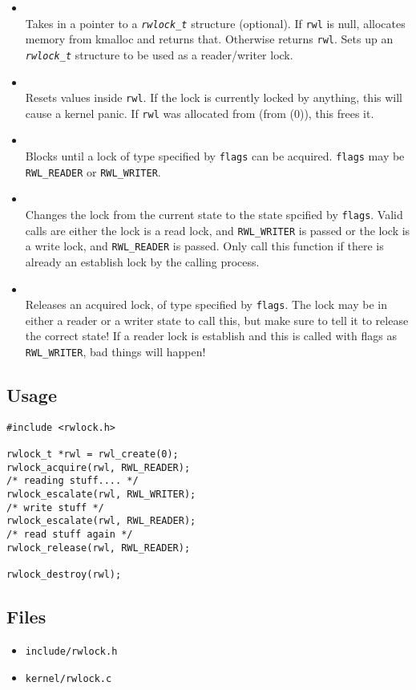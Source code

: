 \documentclass[a4paper]{article}
\begin{document}
\begin{itemize}
\item {} \\
Takes in a pointer to a \texttt{\textit{rwlock\_t}} structure (optional). If \texttt{rwl} is null, allocates
memory from kmalloc and returns that. Otherwise returns \texttt{rwl}. Sets up an \texttt{\textit{rwlock\_t}}
structure to be used as a reader/writer lock.

\item {} \\
Resets values inside \texttt{rwl}. If the lock is currently locked by anything,
this will cause a kernel panic. If \texttt{rwl} was allocated from  (from (0)), this frees it.

\item {} \\
Blocks until a lock of type specified by \texttt{flags} can be acquired. \texttt{flags} may
be \texttt{RWL\_READER} or \texttt{RWL\_WRITER}. 
\item {} \\
Changes the lock from the current state to the state spcified by \texttt{flags}. Valid calls are either
the lock is a read lock, and \texttt{RWL\_WRITER} is passed or the lock is a write lock, and \texttt{RWL\_READER}
is passed. Only call this function if there is already an establish lock by the calling process.
\item {} \\
Releases an acquired lock, of type specified by \texttt{flags}. The lock may be in either a reader or a writer state to call this, but
make sure to tell it to release the correct state! If a reader lock is establish and this is called
with flags as \texttt{RWL\_WRITER}, bad things will happen!
\end{itemize}

\subsection{Usage}
\begin{lstlisting}
#include <rwlock.h>

rwlock_t *rwl = rwl_create(0);
rwlock_acquire(rwl, RWL_READER);
/* reading stuff.... */
rwlock_escalate(rwl, RWL_WRITER);
/* write stuff */
rwlock_escalate(rwl, RWL_READER);
/* read stuff again */
rwlock_release(rwl, RWL_READER);

rwlock_destroy(rwl);
\end{lstlisting}
\subsection{Files}
\begin{itemize}
\item \texttt{include/rwlock.h}
\item \texttt{kernel/rwlock.c}
\end{itemize}
\end{document}
